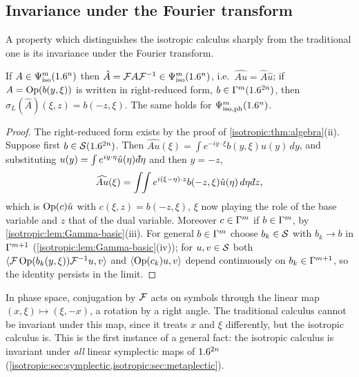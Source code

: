 \subsection{Invariance under the Fourier transform}

A property which distinguishes the isotropic calculus sharply from the
traditional one is its invariance under the Fourier transform.

\begin{proposition}\label{isotropic:prop:fourier}
If $A\in\Psi^{m}_{\mathrm{iso}}(1.6^n)$ then $\hat A=\mathcal{F} A\mathcal{F}^{-1}\in\Psi^{m}_{\mathrm{iso}}(1.6^n)$, i.e.\
$\widehat{Au}=\hat A\hat u$; if $A=\operatorname{Op}(b(y,\xi))$ is written in right-reduced
form, $b\in\Gamma^{m}(1.6^{2n})$, then $\sigma_L(\hat A)(\xi,z)=b(-z,\xi)$. The same holds
for $\Psi^{m}_{\mathrm{iso,ph}}(1.6^n)$.
\end{proposition}
\begin{proof}
The right-reduced form exists by the proof of
\cref{isotropic:thm:algebra}(ii). Suppose first $b\in\mathcal{S}(1.6^{2n})$. Then
$\widehat{Au}(\xi)=\int e^{-iy\cdot\xi}b(y,\xi)u(y)\,dy$, and substituting
$u(y)=\int e^{iy\cdot\eta}\hat u(\eta)\,\dbar\eta$ and then $y=-z$,
\begin{equation*}
  \widehat{Au}(\xi)=\int\!\!\int e^{i(\xi-\eta)\cdot z}b(-z,\xi)\hat u(\eta)\,d\eta\,\dbar z ,
\end{equation*}
which is $\operatorname{Op}(c)\hat u$ with $c(\xi,z)=b(-z,\xi)$, $\xi$ now playing the role of
the base variable and $z$ that of the dual variable. Moreover $c\in\Gamma^{m}$ if
$b\in\Gamma^{m}$, by \cref{isotropic:lem:Gamma-basic}(iii). For general
$b\in\Gamma^{m}$ choose $b_k\in\mathcal{S}$ with $b_k\to b$ in $\Gamma^{m+1}$
(\cref{isotropic:lem:Gamma-basic}(iv)); for $u,v\in\mathcal{S}$ both
$\langle \mathcal{F}\operatorname{Op}(b_k(y,\xi))\mathcal{F}^{-1}u, v\rangle$ and $\langle \operatorname{Op}(c_k)u, v\rangle$ depend
continuously on $b_k\in\Gamma^{m+1}$, so the identity persists in the limit.
\end{proof}

\begin{discussion}
In phase space, conjugation by $\mathcal{F}$ acts on symbols through the linear map
$(x,\xi)\mapsto(\xi,-x)$, a rotation by a right angle. The traditional
calculus cannot be invariant under this map, since it treats $x$ and $\xi$
differently, but the isotropic calculus is. This is the first instance of a
general fact: the isotropic calculus is invariant under \emph{all} linear
symplectic maps of $1.6^{2n}$ (\cref{isotropic:sec:symplectic,isotropic:sec:metaplectic}).
\end{discussion}

